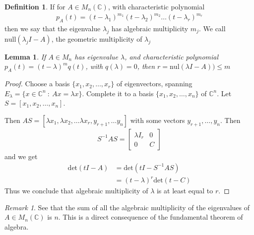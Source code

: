 \documentclass[11pt]{article}
\theoremstyle{plain} %
\newtheorem{lemma}{Lemma}[section]
\theoremstyle{definition} %
\newtheorem{definition}{Definition}[section]
\theoremstyle{remark} %
\newtheorem{remark}{Remark}[section]
\begin{document}
\begin{definition}
  If for $A \in M_n(\mathbb{C})$, with characteristic polynomial
  \begin{align*}
    p_A(t) = (t - \lambda_1)^{m_1} ( t - \lambda_2)^{m_2} \ldots (t -
    \lambda_r)^{m_r}
  \end{align*}
  then we say that the eigenvalue $\lambda_j$ has algebraic
  multiplicity $m_j$. We call $\textrm{null}(\lambda_jI - A)$, the
  geometric multiplicity of $\lambda_j$
\end{definition}

\begin{lemma}
  If $A \in M_n$ has eigenvalue $\lambda$, and characteristic
  polynomial $ p_A(t) = (t - \lambda)^m q(t)$, with $q(\lambda) = 0$,
then $r = \textrm{nul}(\lambda I - A)) \le m$
\end{lemma}
\begin{proof}
Choose a basis $\{ x_1 , x_2 , \ldots , x_r \}$ of eigenvectors,
spanning $E_\lambda = \{ x \in \mathbb{C}^n \ : \ Ax = \lambda x \}$.
Complete it to a basis $\{ x_1 , x_2 , \ldots , x_n \}$ of $
\mathbb{C}^n$. Let $S = [x_1 , x_2 , \ldots , x_n]$.

Then $AS = [ \lambda x_1 , \lambda x_2 , \ldots  \lambda x_r,
y_{r+1}, \ldots y_n]$ with some vectors $y_{r+1} , \ldots , y_n$.
Then
\begin{align*}
  S^{-1}AS =
  \begin{bmatrix}
    \lambda I_r & 0 \\
    0 & C
  \end{bmatrix}
\end{align*}
and we get
\begin{align*}
  \textrm{det}(tI - A) & = \textrm{det}(tI - S^{-1}AS) \\
  &= ( t - \lambda)^r \textrm{det}(t - C)
\end{align*}
Thus we conclude that algebraic multiplicity of $\lambda$ is at least
equal to $r$.
\end{proof}

\begin{remark}
See that the sum of all the algebraic multiplicity of the eigenvalues
of $A \in M_n(\mathbb{C})$ is $n$. This is a direct consequence of
the fundamental theorem of algebra.
\end{remark}
\end{document}
